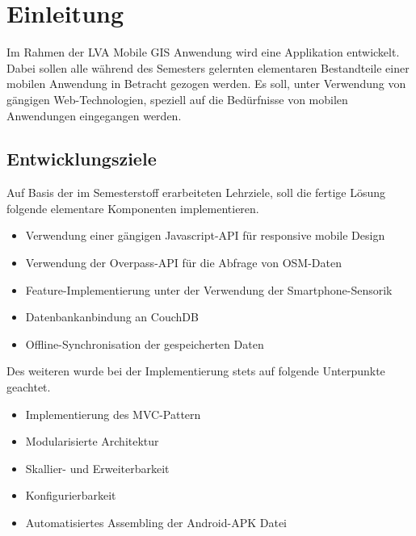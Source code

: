 \chapter{Einleitung}
\label{chp:einleitung}

Im Rahmen der LVA Mobile GIS Anwendung wird eine Applikation entwickelt. Dabei sollen alle während des Semesters gelernten elementaren Bestandteile einer mobilen Anwendung in Betracht gezogen werden. Es soll, unter Verwendung von gängigen Web-Technologien, speziell auf die Bedürfnisse von mobilen Anwendungen eingegangen werden.

\section{Entwicklungsziele}
\label{sec:ziele}

Auf Basis der im Semesterstoff erarbeiteten Lehrziele, soll die fertige Lösung folgende elementare Komponenten implementieren.

\begin{itemize}
  \setlength{\itemsep}{1pt}
  \setlength{\parskip}{0pt}
  \setlength{\parsep}{0pt}
  
  \item Verwendung einer gängigen Javascript-API für responsive mobile Design
  \item Verwendung der Overpass-API für die Abfrage von OSM-Daten
  \item Feature-Implementierung unter der Verwendung der Smartphone-Sensorik
  \item Datenbankanbindung an CouchDB
  \item Offline-Synchronisation der gespeicherten Daten
  
\end{itemize}

Des weiteren wurde bei der Implementierung stets auf folgende Unterpunkte geachtet.

\begin{itemize}
  \setlength{\itemsep}{1pt}
  \setlength{\parskip}{0pt}
  \setlength{\parsep}{0pt}
   
  \item Implementierung des MVC-Pattern
  \item Modularisierte Architektur
  \item Skallier- und Erweiterbarkeit
  \item Konfigurierbarkeit
  \item Automatisiertes Assembling der Android-APK Datei
  
\end{itemize}


